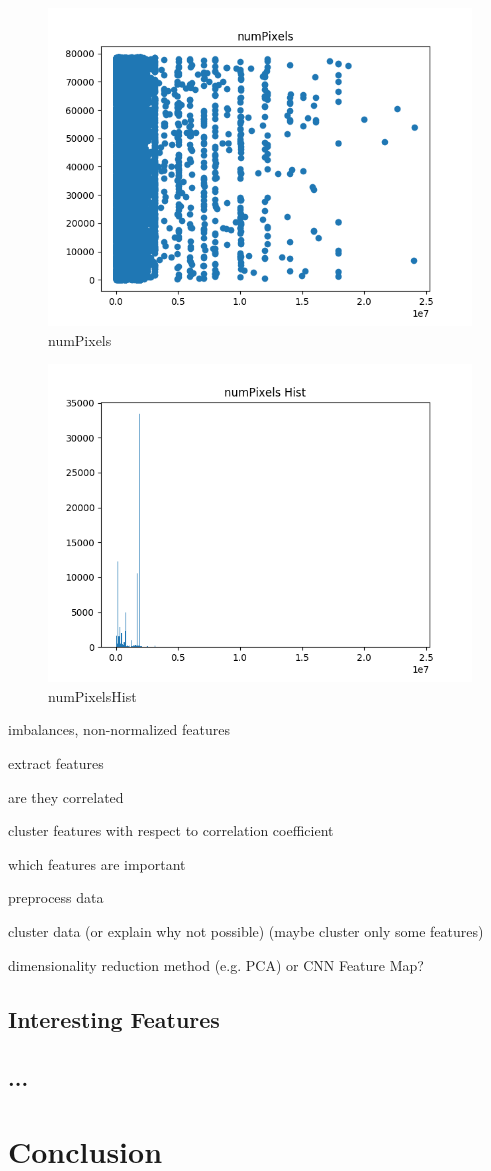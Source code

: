 \begin{figure}
	\includegraphics[width=\textwidth]{images/numPixels}
	\caption{numPixels}
	\label{numPixels}
\end{figure}

\begin{figure}
	\includegraphics[width=\textwidth]{images/numPixelsHist}
	\caption{numPixelsHist}
	\label{numPixelsHist}
\end{figure}

imbalances, non-normalized features

extract features

are they correlated

cluster features with respect to correlation coefficient

which features are important

preprocess data

cluster data (or explain why not possible) (maybe cluster only some features)

dimensionality reduction method (e.g. PCA) or CNN Feature Map?

\section*{Interesting Features}
\section*{...}

\chapter{Conclusion}